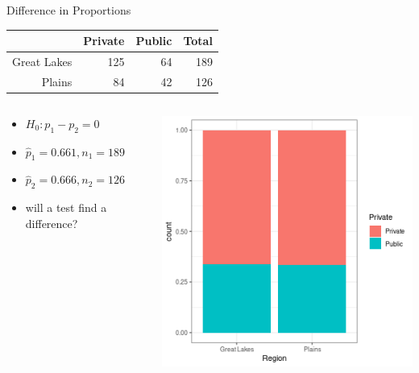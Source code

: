\documentclass{beamer}
\begin{document}
\begin{frame}{Difference in Proportions}
\begin{table}[ht]
\centering
\begin{tabular}{rrrr}
  \hline
 & Private & Public & Total \\ 
  \hline
Great Lakes & 125 &  64 & 189 \\ 
  Plains &  84 &  42 & 126 \\ 
   \hline
\end{tabular}
\end{table}


\begin{columns}

  \begin{column}{0.45\textwidth}
\begin{itemize}
\item $H_0: p_1 - p_2 = 0$
\item $\hat{p}_1 = 0.661, n_1 = 189$
\item $\hat{p}_2 = 0.666, n_2 = 126$
\item will a test find a difference?
\end{itemize}
  \end{column}
  \begin{column}{0.45\textwidth}
     \begin{center}
\includegraphics[scale=0.45]{region_private_2.png}
\end{center}
  \end{column}
\end{columns}
\end{frame}
\end{document}
